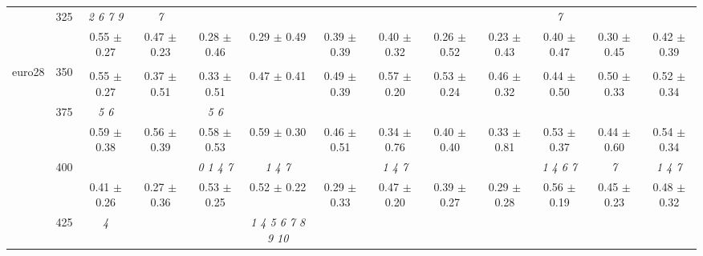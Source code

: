 \begin{table}[h]
{\begin{tabular}{
        ccccccccccccc}
 & \multirow{2}{*}{325}& \cellcolor[HTML]{EFEFEF} \textit{ 2 6 7 9 }& \cellcolor[HTML]{EFEFEF} \textit{ 7 }& \cellcolor[HTML]{EFEFEF} & \cellcolor[HTML]{EFEFEF} & \cellcolor[HTML]{EFEFEF} & \cellcolor[HTML]{EFEFEF} & \cellcolor[HTML]{EFEFEF} & \cellcolor[HTML]{EFEFEF} & \cellcolor[HTML]{EFEFEF} \textit{ 7 }& \cellcolor[HTML]{EFEFEF} & \cellcolor[HTML]{EFEFEF}  \\ 
 & & \cellcolor[HTML]{EFEFEF} 0.55 $\pm$ 0.27& \cellcolor[HTML]{EFEFEF} 0.47 $\pm$ 0.23& \cellcolor[HTML]{EFEFEF} 0.28 $\pm$ 0.46& \cellcolor[HTML]{EFEFEF} 0.29 $\pm$ 0.49& \cellcolor[HTML]{EFEFEF} 0.39 $\pm$ 0.39& \cellcolor[HTML]{EFEFEF} 0.40 $\pm$ 0.32& \cellcolor[HTML]{EFEFEF} 0.26 $\pm$ 0.52& \cellcolor[HTML]{EFEFEF} 0.23 $\pm$ 0.43& \cellcolor[HTML]{EFEFEF} 0.40 $\pm$ 0.47& \cellcolor[HTML]{EFEFEF} 0.30 $\pm$ 0.45& \cellcolor[HTML]{EFEFEF} 0.42 $\pm$ 0.39 \\ 
 \multirow{4}{*}{euro28} & \multirow{2}{*}{350}& & & & & & & & & & &  \\ 
 & & 0.55 $\pm$ 0.27& 0.37 $\pm$ 0.51& 0.33 $\pm$ 0.51& 0.47 $\pm$ 0.41& 0.49 $\pm$ 0.39& 0.57 $\pm$ 0.20& 0.53 $\pm$ 0.24& 0.46 $\pm$ 0.32& 0.44 $\pm$ 0.50& 0.50 $\pm$ 0.33& 0.52 $\pm$ 0.34 \\ 
 & \multirow{2}{*}{375}& \cellcolor[HTML]{EFEFEF} \textit{ 5 6 }& \cellcolor[HTML]{EFEFEF} & \cellcolor[HTML]{EFEFEF} \textit{ 5 6 }& \cellcolor[HTML]{EFEFEF} & \cellcolor[HTML]{EFEFEF} & \cellcolor[HTML]{EFEFEF} & \cellcolor[HTML]{EFEFEF} & \cellcolor[HTML]{EFEFEF} & \cellcolor[HTML]{EFEFEF} & \cellcolor[HTML]{EFEFEF} & \cellcolor[HTML]{EFEFEF}  \\ 
 & & \cellcolor[HTML]{EFEFEF} 0.59 $\pm$ 0.38& \cellcolor[HTML]{EFEFEF} 0.56 $\pm$ 0.39& \cellcolor[HTML]{EFEFEF} 0.58 $\pm$ 0.53& \cellcolor[HTML]{EFEFEF} 0.59 $\pm$ 0.30& \cellcolor[HTML]{EFEFEF} 0.46 $\pm$ 0.51& \cellcolor[HTML]{EFEFEF} 0.34 $\pm$ 0.76& \cellcolor[HTML]{EFEFEF} 0.40 $\pm$ 0.40& \cellcolor[HTML]{EFEFEF} 0.33 $\pm$ 0.81& \cellcolor[HTML]{EFEFEF} 0.53 $\pm$ 0.37& \cellcolor[HTML]{EFEFEF} 0.44 $\pm$ 0.60& \cellcolor[HTML]{EFEFEF} 0.54 $\pm$ 0.34 \\ 
 & \multirow{2}{*}{400}& & & \textit{ 0 1 4 7 }& \textit{ 1 4 7 }& & \textit{ 1 4 7 }& & & \textit{ 1 4 6 7 }& \textit{ 7 }& \textit{ 1 4 7 } \\ 
 & & 0.41 $\pm$ 0.26& 0.27 $\pm$ 0.36& 0.53 $\pm$ 0.25& 0.52 $\pm$ 0.22& 0.29 $\pm$ 0.33& 0.47 $\pm$ 0.20& 0.39 $\pm$ 0.27& 0.29 $\pm$ 0.28& 0.56 $\pm$ 0.19& 0.45 $\pm$ 0.23& 0.48 $\pm$ 0.32 \\ 
 & \multirow{2}{*}{425}& \cellcolor[HTML]{EFEFEF} \textit{ 4 }& \cellcolor[HTML]{EFEFEF} & \cellcolor[HTML]{EFEFEF} & \cellcolor[HTML]{EFEFEF} \textit{  1  4  5  6  7  8  9 10 }& \cellcolor[HTML]{EFEFEF} & \cellcolor[HTML]{EFEFEF} & \cellcolor[HTML]{EFEFEF} & \cellcolor[HTML]{EFEFEF} & \cellcolor[HTML]{EFEFEF} & \cellcolor[HTML]{EFEFEF} & \cellcolor[HTML]{EFEFEF}  \\ 

\end{tabular}}
\end{table}
